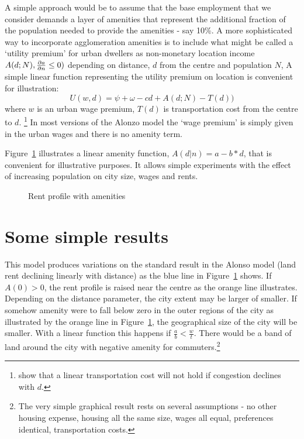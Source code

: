 A simple approach would be to assume that the base employment that we consider demands a layer of amenities that represent the additional fraction of  the population needed to provide the amenities - say 10\%. A more sophisticated  way to incorporate agglomeration amenities is to include what might be called a `utility premium' for urban dwellers  as non-monetary location income $A(d; N), \frac{\partial a}{\partial n}\leq 0)$ depending on distance, $d$ from the centre and population $N$, A simple linear  function representing the utility premium on location is convenient for illustration:
\begin{equation}
U(w,d)= \psi+ \omega-cd + A(d; N) - T(d))
\label{eqn-u}
\end{equation}
where $w$  is an urban wage premium, $T(d)$ is transportation cost from the centre to $d$.
\footnote{\cite{anasUrbanSpatialStructure1998} show that a linear transportation cost will not  hold if congestion declines  with $d$.} 
 In most  versions of the Alonzo model the `wage premium' is simply given in the urban wages and  there is no amenity term. 


 
Figure~\ref{fig-amenity} illustrates a linear amenity function, $A(d|n)= a-b*d$, that is convenient for illustrative purposes.  It allows simple experiments with the effect of  increasing population on city size, wages and rents.

\begin{figure}[htbp]
\begin{center}

\end{center}
\caption{Rent profile with amenities}
\label{fig-amenity}
\end{figure}

\section{Some simple results}
 This model produces  variations on the standard result in the Alonso model (land rent declining linearly with distance) as the blue line in Figure~\ref{fig-amenity} shows.  If $A(0)>0$, the rent profile is raised near the centre as the  orange line illustrates. Depending on the distance parameter, the city extent may be larger of smaller.  If somehow amenity were to fall below zero in the outer regions of the city as illustrated by the orange line  in Figure~\ref{fig-amenity}, the geographical size of the  city will be smaller. With a linear function this happens if $\frac{a}{b} < \frac{w}{t}$. There would be a band of land around the city with negative amenity for commuters.\footnote{The very simple graphical result rests on several assumptions - no other housing expense, housing all the same size, wages all equal, preferences identical, transportation costs.}

